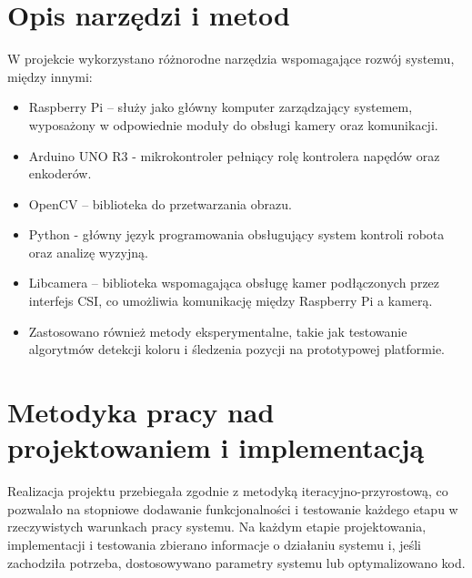 \section{Opis narzędzi i metod}
W projekcie wykorzystano różnorodne narzędzia wspomagające rozwój systemu, między innymi:

\begin{itemize}
    \item Raspberry Pi – służy jako główny komputer zarządzający systemem, wyposażony w odpowiednie moduły do obsługi kamery oraz komunikacji.
    \item Arduino UNO R3 - mikrokontroler pełniący rolę kontrolera napędów oraz enkoderów. 
    \item OpenCV – biblioteka do przetwarzania obrazu. 
    \item Python - główny język programowania obsługujący system kontroli robota oraz analizę wyzyjną. 
    \item Libcamera – biblioteka wspomagająca obsługę kamer podłączonych przez interfejs CSI, co umożliwia komunikację między Raspberry Pi a kamerą.
    \item Zastosowano również metody eksperymentalne, takie jak testowanie algorytmów detekcji koloru i śledzenia pozycji na prototypowej platformie.
\end{itemize}


\section{Metodyka pracy nad projektowaniem i implementacją}
Realizacja projektu przebiegała zgodnie z metodyką iteracyjno-przyrostową, co pozwalało na stopniowe dodawanie funkcjonalności i testowanie każdego etapu w rzeczywistych warunkach pracy systemu. Na każdym etapie projektowania, implementacji i testowania zbierano informacje o działaniu systemu i, jeśli zachodziła potrzeba, dostosowywano parametry systemu lub optymalizowano kod.